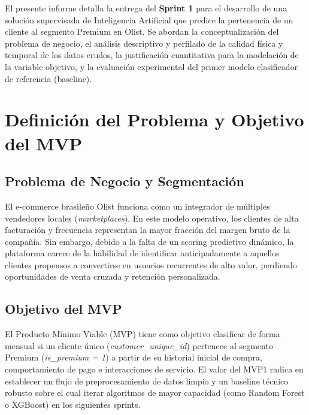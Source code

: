 \documentclass[journal,letterpaper]{IEEEtran}
\begin{document}
El presente informe detalla la entrega del \textbf{Sprint 1} para el desarrollo de una solución supervisada de Inteligencia Artificial que predice la pertenencia de un cliente al segmento Premium en Olist. Se abordan la conceptualización del problema de negocio, el análisis descriptivo y perfilado de la calidad física y temporal de los datos crudos, la justificación cuantitativa para la modelación de la variable objetivo, y la evaluación experimental del primer modelo clasificador de referencia (baseline).

\section{Definición del Problema y Objetivo del MVP}
\subsection{Problema de Negocio y Segmentación}
El e-commerce brasileño Olist funciona como un integrador de múltiples vendedores locales (\textit{marketplaces}). En este modelo operativo, los clientes de alta facturación y frecuencia representan la mayor fracción del margen bruto de la compañía. Sin embargo, debido a la falta de un scoring predictivo dinámico, la plataforma carece de la habilidad de identificar anticipadamente a aquellos clientes propensos a convertirse en usuarios recurrentes de alto valor, perdiendo oportunidades de venta cruzada y retención personalizada.

\subsection{Objetivo del MVP}
El Producto Mínimo Viable (MVP) tiene como objetivo clasificar de forma mensual si un cliente único (\textit{customer\_unique\_id}) pertenece al segmento Premium (\textit{is\_premium = 1}) a partir de su historial inicial de compra, comportamiento de pago e interacciones de servicio. El valor del MVP1 radica en establecer un flujo de preprocesamiento de datos limpio y un baseline técnico robusto sobre el cual iterar algoritmos de mayor capacidad (como Random Forest o XGBoost) en los siguientes sprints.
\end{document}
